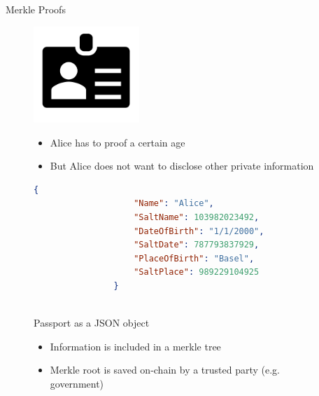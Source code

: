 \documentclass[handout]{beamer}
\begin{document}

\begin{frame}[fragile]{Merkle Proofs}
	\begin{figure}
		\begin{minipage}[h]{0.55\linewidth}
			\centering
			\includegraphics[width=4cm]{../assets/images/id.PNG}
		\end{minipage}%
		\hfill
		\begin{minipage}[h]{0.45\linewidth}
			\begin{itemize}
				\item<1 ->Alice has to proof a certain age
				\item<1 ->But Alice does not want to disclose other private information
			\end{itemize}
		\end{minipage}
	\end{figure}
	\vspace{-0.5cm}
	\begin{figure}
		\begin{minipage}[h]{0.55\linewidth}
			\hspace{-0.5cm}
			\begin{adjustbox}{width = 0.8\linewidth}
			\begin{lstlisting}[language=json,firstnumber=1]
				{
					"Name": "Alice",
					"SaltName": 103982023492,
					"DateOfBirth": "1/1/2000",
					"SaltDate": 787793837929,
					"PlaceOfBirth": "Basel",
					"SaltPlace": 989229104925
				}
			\end{lstlisting}
			\end{adjustbox}
			\centering
			\\[0.1cm] \scriptsize{Passport as a JSON object}
		\end{minipage}%
		\hfill
		\begin{minipage}[h]{0.45\linewidth}
			\begin{itemize}
				\item<2 ->Information is included in a merkle tree
				\item<2 ->Merkle root is saved on-chain by a trusted party (e.g. government)
			\end{itemize}
		\end{minipage}
	\end{figure}
\end{frame}
\end{document}
